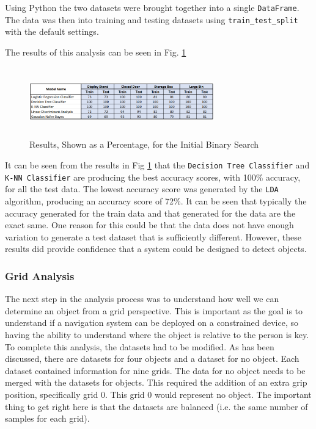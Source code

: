 \documentclass[conference]{IEEEtran}
\begin{document}
Using Python the two datasets were brought together into a single \texttt{DataFrame}. The data was then into training and testing datasets using \texttt{train\_test\_split} with the default settings.

The results of this analysis can be seen in Fig. \ref{fig:init_binary}
\begin{figure}[ht]
\includegraphics[width=8cm, height=3cm]{images/initial_binary_search.png}
\centering
\caption{Results, Shown as a Percentage, for the Initial Binary Search}
\label{fig:init_binary}
\end{figure}

It can be seen from the results in Fig \ref{fig:init_binary} that the \texttt{Decision Tree Classifier} and \texttt{K-NN Classifier} are producing the best accuracy scores, with 100\% accuracy, for all the test data. The lowest accuracy score was generated by the \texttt{LDA} algorithm, producing an accuracy score of 72\%. It can be seen that typically the accuracy generated for the train data and that generated for the data are the exact same. One reason for this could be that the data does not have enough variation to generate a test dataset that is sufficiently different. However, these results did provide confidence that a system could be designed to detect objects. 

\subsubsection{Grid Analysis}
The next step in the analysis process was to understand how well we can determine an object from a grid perspective. This is important as the goal is to understand if a navigation system can be deployed on a constrained device, so having the ability to understand where the object is relative to the person is key.
To complete this analysis, the datasets had to be modified. As has been discussed, there are datasets for four objects and a dataset for no object. Each dataset contained information for nine grids. The data for no object needs to be merged with the datasets for objects. This required the addition of an extra grip position, specifically grid 0. This grid 0 would represent no object. The important thing to get right here is that the datasets are balanced (i.e. the same number of samples for each grid). 
\end{document}
